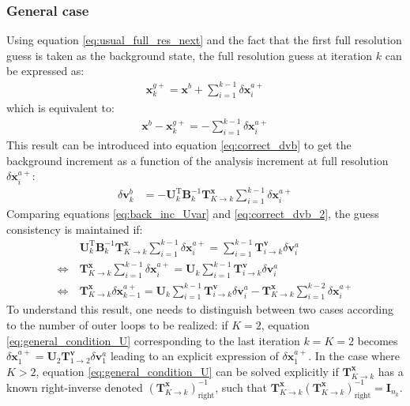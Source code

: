 \documentclass[npg, manuscript]{copernicus}
\begin{document}
\subsubsection{General case}
Using equation \eqref{eq:usual_full_res_next} and the fact that the first full resolution guess is taken as the background state, the full resolution guess at iteration $k$ can be expressed as:
\begin{align}
\label{eq:usual_full_res}
\mathbf{x}^{g+}_k = \mathbf{x}^{b} + \sum_{i=1}^{k-1} \delta \mathbf{x}^{a+}_i
\end{align}
which is equivalent to:
\begin{align}
\mathbf{x}^b - \mathbf{x}^{g+}_k = - \sum_{i=1}^{k-1} \delta \mathbf{x}^{a+}_i
\end{align}
This result can be introduced into equation \eqref{eq:correct_dvb} to get the background increment as a function of the analysis increment at full resolution $\delta \mathbf{x}^{a+}_i$:
\begin{align}
\label{eq:correct_dvb_2}
\delta \mathbf{v}^b_k & = -\mathbf{U}_k^\mathrm{T} \mathbf{B}^{-1}_k \mathbf{T}^\mathbf{x}_{K \rightarrow k} \sum_{i=1}^{k-1} \delta \mathbf{x}^{a+}_i
\end{align}
Comparing equations \eqref{eq:back_inc_Uvar} and \eqref{eq:correct_dvb_2}, the guess consistency is maintained if:
\begin{align}
\label{eq:general_condition_U}
& \mathbf{U}_k^\mathrm{T} \mathbf{B}^{-1}_k \mathbf{T}^\mathbf{x}_{K \rightarrow k} \sum_{i=1}^{k-1} \delta \mathbf{x}^{a+}_i = \sum_{i=1}^{k-1} \mathbf{T}^\mathbf{v}_{i \rightarrow k} \delta \mathbf{v}^a_i \nonumber \\
\Leftrightarrow \ & \mathbf{T}^\mathbf{x}_{K \rightarrow k} \sum_{i=1}^{k-1} \delta \mathbf{x}^{a+}_i = \mathbf{U}_k \sum_{i=1}^{k-1} \mathbf{T}^\mathbf{v}_{i \rightarrow k} \delta \mathbf{v}^a_i \nonumber \\
\Leftrightarrow \ & \boxed{\mathbf{T}^\mathbf{x}_{K \rightarrow k} \delta \mathbf{x}^{a+}_{k-1} = \mathbf{U}_k \sum_{i=1}^{k-1} \mathbf{T}^\mathbf{v}_{i \rightarrow k} \delta \mathbf{v}^a_i - \mathbf{T}^\mathbf{x}_{K \rightarrow k} \sum_{i=1}^{k-2} \delta \mathbf{x}^{a+}_i}
\end{align}
To understand this result, one needs to distinguish between two cases according to the number of outer loops to be realized: if $K=2$, equation \eqref{eq:general_condition_U} corresponding to the last iteration $k=K=2$ becomes $\delta \mathbf{x}^{a+}_1 = \mathbf{U}_2 \mathbf{T}^\mathbf{v}_{1 \rightarrow 2} \delta \mathbf{v}^a_1$ leading to an explicit expression of $\delta \mathbf{x}^{a+}_1$. In the case where $K>2$, equation \eqref{eq:general_condition_U} can be solved explicitly if $\mathbf{T}^\mathbf{x}_{K \rightarrow k}$ has a known right-inverse denoted $\left(\mathbf{T}^\mathbf{x}_{K \rightarrow k}\right)^{-1}_\text{right}$, such that $\mathbf{T}^\mathbf{x}_{K \rightarrow k} \left(\mathbf{T}^\mathbf{x}_{K \rightarrow k}\right)^{-1}_\text{right} = \mathbf{I}_{n_k}$.
\end{document}
